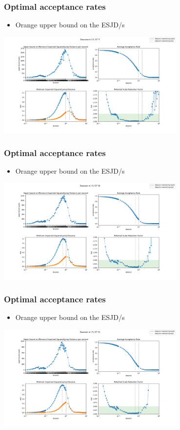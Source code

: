 \begin{frame}[t]
    \frametitle{Optimal acceptance rates}
    \begin{itemize}
    \item {\color{orange} Orange } upper bound on the ESJD/s
    \end{itemize}
    \centering
    \includegraphics[width=0.7\textwidth]{imgs/bound-5-dim-7-Gaussian-results.png}
\end{frame}

\begin{frame}[t]
    \frametitle{Optimal acceptance rates}
    \begin{itemize}
        \item {\color{orange} Orange } upper bound on the ESJD/s
    \end{itemize}
    \centering
    \includegraphics[width=0.7\textwidth]{imgs/bound-5-dim-10-Gaussian-results.png}
\end{frame}

\begin{frame}[t]
    \frametitle{Optimal acceptance rates}
    \begin{itemize}
    \item {\color{orange} Orange } upper bound on the ESJD/s
    \end{itemize}
    \centering
    \includegraphics[width=0.7\textwidth]{imgs/bound-5-dim-12-Gaussian-results.png}
\end{frame}

